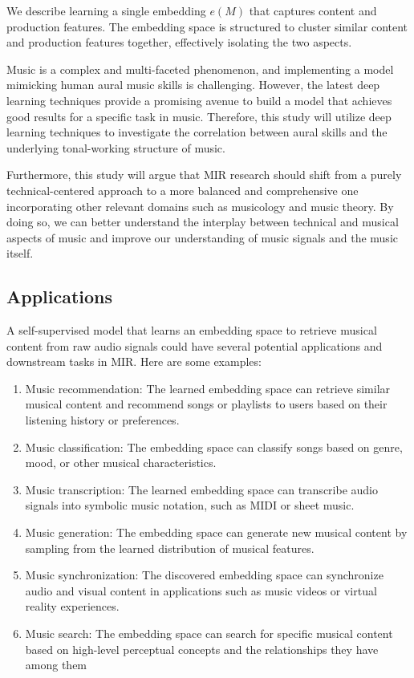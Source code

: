 We describe learning a single embedding $e(M)$ that captures content and production features. The embedding space is structured to cluster similar content and production features together, effectively isolating the two aspects.

Music is a complex and multi-faceted phenomenon, and implementing a model mimicking human aural music skills is challenging. However, the latest deep learning techniques provide a promising avenue to build a model that achieves good results for a specific task in music. Therefore, this study will utilize deep learning techniques to investigate the correlation between aural skills and the underlying tonal-working structure of music.

Furthermore, this study will argue that MIR research should shift from a purely technical-centered approach to a more balanced and comprehensive one incorporating other relevant domains such as musicology and music theory. By doing so, we can better understand the interplay between technical and musical aspects of music and improve our understanding of music signals and the music itself.


\subsection{Applications}

A self-supervised model that learns an embedding space to retrieve musical content from raw audio signals could have several potential applications and downstream tasks in MIR. Here are some examples:

\begin{enumerate}
\item Music recommendation: The learned embedding space can retrieve similar musical content and recommend songs or playlists to users based on their listening history or preferences.
\item Music classification: The embedding space can classify songs based on genre, mood, or other musical characteristics.
\item Music transcription: The learned embedding space can transcribe audio signals into symbolic music notation, such as MIDI or sheet music.
\item Music generation: The embedding space can generate new musical content by sampling from the learned distribution of musical features.
\item Music synchronization: The discovered embedding space can synchronize audio and visual content in applications such as music videos or virtual reality experiences.
\item Music search: The embedding space can search for specific musical content based on high-level perceptual concepts and the relationships they have among them
\end{enumerate}

